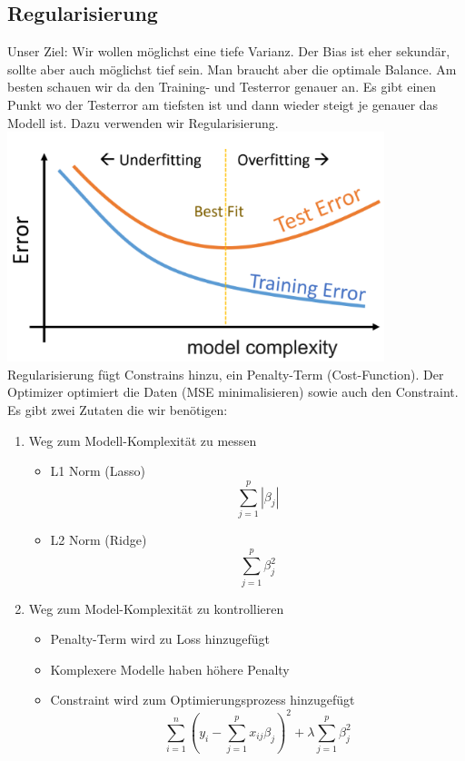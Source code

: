 \subsection{Regularisierung}
Unser Ziel: Wir wollen möglichst eine tiefe Varianz. Der Bias ist eher sekundär, sollte aber auch möglichst tief sein. Man braucht aber die optimale Balance. Am besten schauen wir da den Training- und Testerror genauer an. Es gibt einen Punkt wo der Testerror am tiefsten ist und dann wieder steigt je genauer das Modell ist. Dazu verwenden wir Regularisierung.
\includegraphics[width=\linewidth]{img/regularization.png}
Regularisierung fügt Constrains hinzu, ein Penalty-Term (Cost-Function). Der Optimizer optimiert die Daten (MSE minimalisieren) sowie auch den Constraint.
Es gibt zwei Zutaten die wir benötigen:
\begin{enumerate}
\item Weg zum Modell-Komplexität zu messen
\begin{itemize}
\item L1 Norm (Lasso) 
$$\sum_{j=1}^p | \beta_j|$$
\item L2 Norm (Ridge)
$$\sum_{j=1}^p \beta^2_j$$
\end{itemize}
\item Weg zum Model-Komplexität zu kontrollieren
\begin{itemize}
\item Penalty-Term wird zu Loss hinzugefügt
\item Komplexere Modelle haben höhere Penalty
\item Constraint wird zum Optimierungsprozess hinzugefügt
$$\sum_{i=1}^n(y_i-\sum_{j=1}^p x_{ij} \beta_j)^2+ \lambda \sum_{j=1}^p \beta^2_j$$
\end{itemize}
\end{enumerate}

